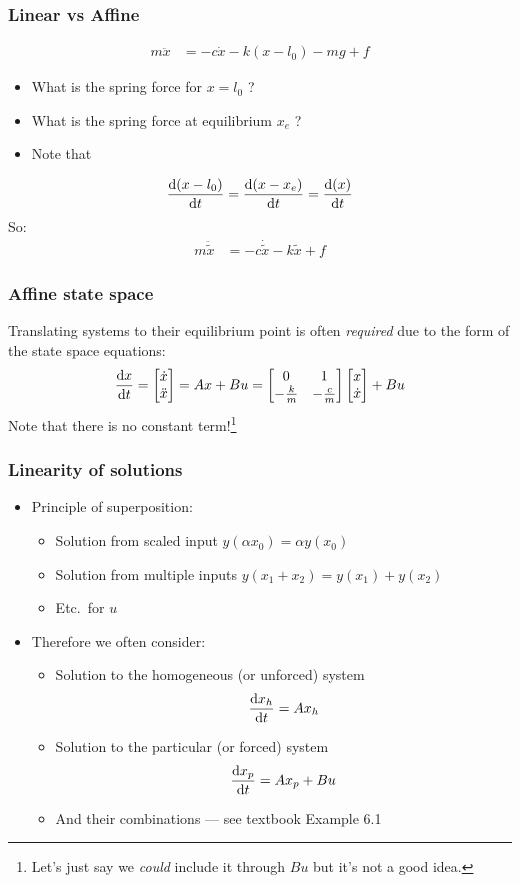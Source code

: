 \documentclass{beamer-control}
\begin{document}
\begin{frame}
\frametitle{Linear vs Affine}

\begin{align}
m\ddot x &= -c\dot x - k (x-l_0) - mg + f
\end{align}
\begin{itemize}
\item What is the spring force for $x = l_0$ ?
\item What is the spring force at equilibrium $x_e$ ?
\item Note that 
\end{itemize}
\begin{align}
\frac{\mathrm{d} (x-l_0)}{\mathrm{d} t} =
\frac{\mathrm{d} (x-x_e)}{\mathrm{d} t} =
\frac{\mathrm{d} (x)}{\mathrm{d} t}
\end{align}
So:
\begin{align}
m\ddot {\tilde{x}} &= -c\dot{\tilde x} - k \tilde{x} + f
\end{align}

\end{frame}

\begin{frame}
\frametitle{Affine state space}
Translating systems to their equilibrium point is often \emph{required} due to the form of the state space equations:
\begin{align}
\frac{\mathrm{d} x}{\mathrm{d} t} = \begin{bmatrix}\dot x\\\ddot x\end{bmatrix} = Ax + Bu = \begin{bmatrix}0 & 1\\ -\frac km & -\frac cm \end{bmatrix} \begin{bmatrix}x \\ \dot x\end{bmatrix} + Bu
\end{align}
Note that there is no constant term!\footnote{Let's just say we \emph{could} include it through  $Bu$  but it's not a good idea.}
\end{frame}

\begin{frame}
\frametitle{Linearity of solutions}
\begin{itemize}
\item<uncover@1-> Principle of superposition:
\begin{itemize}
\item Solution from scaled input $y(\alpha x_0)=\alpha y(x_0)$
\item Solution from multiple inputs $y(x_1+x_2)=y(x_1)+y(x_2)$
\item Etc.\ for $u$
\end{itemize}
\item<uncover@2-> Therefore we often consider:
\begin{itemize}
\item Solution to the homogeneous (or unforced) system \[\frac{\mathrm{d} x_h}{\mathrm{d} t}=Ax_h\]
\item Solution to the particular (or forced) system \[\frac{\mathrm{d} x_p}{\mathrm{d} t}=Ax_p+Bu\]
\item And their combinations --- see textbook Example 6.1
\end{itemize}
\end{itemize}
\end{frame}
\end{document}
